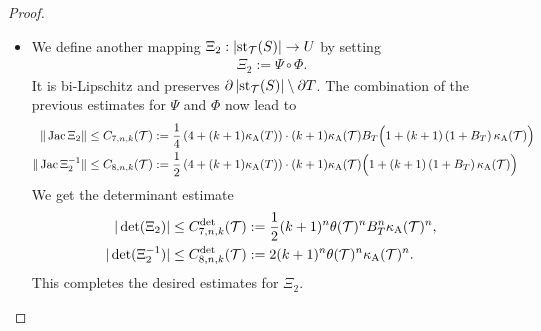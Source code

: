 \documentclass[10pt,letterpaper]{article}
\begin{document}
\begin{proof}
\begin{itemize}
        
        
        
        





        
        
        
        
        
        
        \item 
        We define another mapping $ \Xi_{2} : \left| \operatorname{st}_{{\mathcal T}}(S) \right| \rightarrow U $ by setting 
        \begin{align*}
            \Xi_{2} := \Psi \circ \Phi.
        \end{align*}
        It is bi-Lipschitz and preserves $\partial\left| \operatorname{st}_{{\mathcal T}}(S) \right| \setminus \partial T$. 
        The combination of the previous estimates for $\Psi$ and $\Phi$ now lead to 
        \begin{align*}
            \| \operatorname{{\rm Jac}} \Xi_{2} \|
            &\leq 
            C_{7,n,k}({\mathcal T})
            :=
            \frac 1 4
            \left( 4 + (k+1) \kappa_{{\rm A}}(T) \right)
            \cdot 
            (k+1) 
            \kappa_{{\rm A}}({\mathcal T})
            B_{T}
            \Big( 
                1 
                + 
                (k+1) 
                \left( 1 + B_{T} \right)
                \kappa_{{\rm A}}({\mathcal T})
            \Big)            
            \\
            \| \operatorname{{\rm Jac}} \Xi_{2}^{-1} \|
            &\leq  
            C_{8,n,k}({\mathcal T})
            :=
            \frac 1 2
            \left( 4 + (k+1) \kappa_{{\rm A}}(T) \right)
            \cdot 
            (k+1) 
            \kappa_{{\rm A}}({\mathcal T})
            \Big( 
                1 
                + 
                (k+1) 
                \left( 1 + B_{T} \right)
                \kappa_{{\rm A}}({\mathcal T})
            \Big)            
        \end{align*}
        We get the determinant estimate 
        \begin{align*}
            |\det(\Xi_{2})|
            &\leq 
            C^{\det}_{7,n,k}({\mathcal T})
            :=
            \frac 1 2 
            (k+1)^{n}
            \theta({\mathcal T})^{n}
            B_{T}^{n}
            \kappa_{{\rm A}}({\mathcal T})^{n}
            ,
            \\
            |\det(\Xi_{2}^{-1})|
            &\leq 
            C^{\det}_{8,n,k}({\mathcal T})
            :=
            2
            (k+1)^{n}
            \theta({\mathcal T})^{n}
            \kappa_{{\rm A}}({\mathcal T})^{n}
            .
        \end{align*}
        This completes the desired estimates for $\Xi_{2}$. 
        

\end{itemize}
\end{proof}
\end{document}

